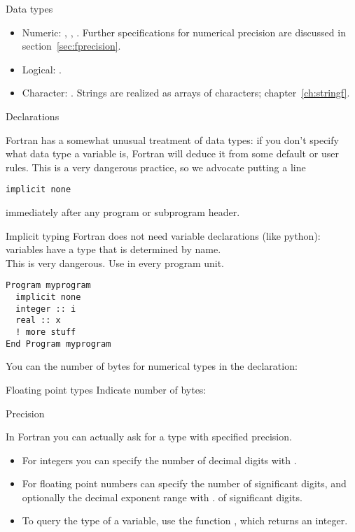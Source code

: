 \begin{block}{Data types}
  \begin{itemize}
  \item Numeric: , ,
    . Further specifications for numerical
    precision are discussed in section~\ref{sec:fprecision}.
  \item Logical: .
  \item Character: . Strings are realized as
    arrays of characters; chapter~\ref{ch:stringf}.
  \end{itemize}  
\end{block}

 {Declarations}
\label{sec:ftype}

Fortran has a somewhat unusual treatment of data types: if you don't
specify what data type a variable is, Fortran will deduce it from some
default or user rules. This is a very dangerous practice, so we
advocate putting a line
\begin{lstlisting}
implicit none
\end{lstlisting}
immediately after any program or subprogram header.

\begin{slide}{Implicit typing}
  \label{sl:fimplicit}
  Fortran does not need variable declarations (like python):\\
  variables have a type that is determined by name.\\
  This is very dangerous. Use 
  in every program unit.
\begin{lstlisting}
Program myprogram
  implicit none
  integer :: i
  real :: x
  ! more stuff
End Program myprogram
\end{lstlisting}
\end{slide}

You can the number of bytes for numerical types in the declaration:
%

\begin{slide}{Floating point types}
  \label{sl:ffloat}
  Indicate number of bytes:
\end{slide}

 {Precision}
\label{sec:fprecision}

In Fortran you can actually ask for a type with specified precision.
\begin{itemize}
\item For integers you can specify the number of decimal digits with
  .
\item For floating point numbers can specify the number of
  significant digits, and optionally the decimal exponent range with
  .
  of significant digits.
\item To query the type of a variable, use the function
  , which returns an integer.
\end{itemize}

